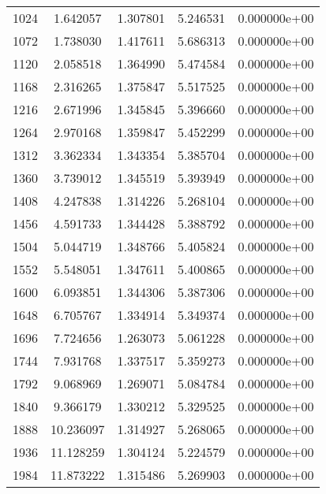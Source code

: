 \documentclass[10pt,a4paper]{article}
\theoremstyle{dotlessP}
\begin{document}
\begin{table}[tbhp]
{\begin{center}
\begin{tabular}{ccccc}
1024  &   1.642057  &   1.307801 &   5.246531 &  0.000000e+00\\ 
1072  &   1.738030  &   1.417611 &   5.686313 &  0.000000e+00\\ 
1120  &   2.058518  &   1.364990 &   5.474584 &  0.000000e+00\\ 
1168  &   2.316265  &   1.375847 &   5.517525 &  0.000000e+00\\ 
1216  &   2.671996  &   1.345845 &   5.396660 &  0.000000e+00\\ 
1264  &   2.970168  &   1.359847 &   5.452299 &  0.000000e+00\\ 
1312  &   3.362334  &   1.343354 &   5.385704 &  0.000000e+00\\ 
1360  &   3.739012  &   1.345519 &   5.393949 &  0.000000e+00\\ 
1408  &   4.247838  &   1.314226 &   5.268104 &  0.000000e+00\\ 
1456  &   4.591733  &   1.344428 &   5.388792 &  0.000000e+00\\ 
1504  &   5.044719  &   1.348766 &   5.405824 &  0.000000e+00\\ 
1552  &   5.548051  &   1.347611 &   5.400865 &  0.000000e+00\\ 
1600  &   6.093851  &   1.344306 &   5.387306 &  0.000000e+00\\ 
1648  &   6.705767  &   1.334914 &   5.349374 &  0.000000e+00\\ 
1696  &   7.724656  &   1.263073 &   5.061228 &  0.000000e+00\\ 
1744  &   7.931768  &   1.337517 &   5.359273 &  0.000000e+00\\ 
1792  &   9.068969  &   1.269071 &   5.084784 &  0.000000e+00\\ 
1840  &   9.366179  &   1.330212 &   5.329525 &  0.000000e+00\\ 
1888  &  10.236097  &   1.314927 &   5.268065 &  0.000000e+00\\ 
1936  &  11.128259  &   1.304124 &   5.224579 &  0.000000e+00\\ 
1984  &  11.873222  &   1.315486 &   5.269903 &  0.000000e+00\\ 
				\hline 
\end{tabular} 
\end{center}
}
\end{table}
\end{document}
